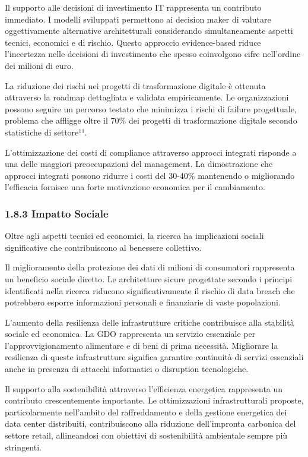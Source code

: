 \documentclass{report}
\begin{document}
Il supporto alle decisioni di investimento IT rappresenta un contributo
immediato. I modelli sviluppati permettono ai decision maker di valutare
oggettivamente alternative architetturali considerando simultaneamente
aspetti tecnici, economici e di rischio. Questo approccio evidence-based
riduce l'incertezza nelle decisioni di investimento che spesso
coinvolgono cifre nell'ordine dei milioni di euro.

La riduzione dei rischi nei progetti di trasformazione digitale è
ottenuta attraverso la roadmap dettagliata e validata empiricamente. Le
organizzazioni possono seguire un percorso testato che minimizza i
rischi di failure progettuale, problema che affligge oltre il 70\% dei
progetti di trasformazione digitale secondo statistiche di settore¹¹.

L'ottimizzazione dei costi di compliance attraverso approcci integrati
risponde a una delle maggiori preoccupazioni del management. La
dimostrazione che approcci integrati possono ridurre i costi del 30-40\%
mantenendo o migliorando l'efficacia fornisce una forte motivazione
economica per il cambiamento.

\subsubsection{\texorpdfstring{\textbf{1.8.3 Impatto
Sociale}}{1.8.3 Impatto Sociale}}\label{impatto-sociale}

Oltre agli aspetti tecnici ed economici, la ricerca ha implicazioni
sociali significative che contribuiscono al benessere collettivo.

Il miglioramento della protezione dei dati di milioni di consumatori
rappresenta un beneficio sociale diretto. Le architetture sicure
progettate secondo i principi identificati nella ricerca riducono
significativamente il rischio di data breach che potrebbero esporre
informazioni personali e finanziarie di vaste popolazioni.

L'aumento della resilienza delle infrastrutture critiche contribuisce
alla stabilità sociale ed economica. La GDO rappresenta un servizio
essenziale per l'approvvigionamento alimentare e di beni di prima
necessità. Migliorare la resilienza di queste infrastrutture significa
garantire continuità di servizi essenziali anche in presenza di attacchi
informatici o disruption tecnologiche.

Il supporto alla sostenibilità attraverso l'efficienza energetica
rappresenta un contributo crescentemente importante. Le ottimizzazioni
infrastrutturali proposte, particolarmente nell'ambito del
raffreddamento e della gestione energetica dei data center distribuiti,
contribuiscono alla riduzione dell'impronta carbonica del settore
retail, allineandosi con obiettivi di sostenibilità ambientale sempre
più stringenti.
\end{document}
